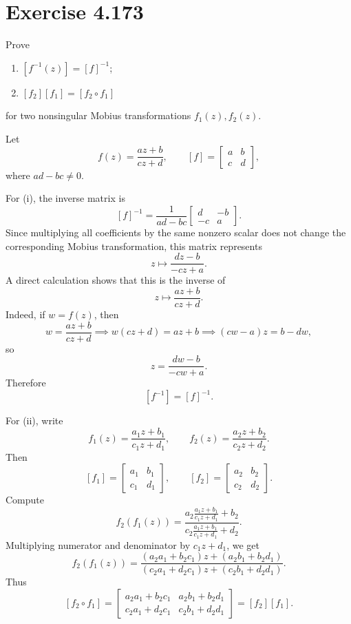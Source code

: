 \documentclass{article}
\begin{document}
\section{Exercise 4.173}

Prove

\begin{enumerate}
  \item[(i)] $[f^{-1}(z)]=[f]^{-1}$;
  \item[(ii)] $[f_2][f_1]=[f_2\circ f_1]$
\end{enumerate}
for two nonsingular Mobius transformations $f_1(z),f_2(z)$.

\begin{solution}
  Let
  \[
    f(z)=\frac{az+b}{cz+d},
    \qquad
    [f]=
    \begin{bmatrix}
      a & b \\
      c & d
    \end{bmatrix},
  \]
  where $ad-bc\ne0$.

  For (i), the inverse matrix is
  \[
    [f]^{-1}
    =
    \frac1{ad-bc}
    \begin{bmatrix}
      d & -b \\
      -c & a
    \end{bmatrix}.
  \]
  Since multiplying all coefficients by the same nonzero scalar does not
  change the corresponding Mobius transformation, this matrix represents
  \[
    z\mapsto
    \frac{dz-b}{-cz+a}.
  \]
  A direct calculation shows that this is the inverse of
  \[
    z\mapsto \frac{az+b}{cz+d}.
  \]
  Indeed, if $w=f(z)$, then
  \[
    w=\frac{az+b}{cz+d}
    \implies
    w(cz+d)=az+b
    \implies
    (cw-a)z=b-dw,
  \]
  so
  \[
    z=\frac{dw-b}{-cw+a}.
  \]
  Therefore
  \[
    [f^{-1}]=[f]^{-1}.
  \]

  For (ii), write
  \[
    f_1(z)=\frac{a_1z+b_1}{c_1z+d_1},
    \qquad
    f_2(z)=\frac{a_2z+b_2}{c_2z+d_2}.
  \]
  Then
  \[
    [f_1]=
    \begin{bmatrix}
      a_1 & b_1 \\
      c_1 & d_1
    \end{bmatrix},
    \qquad
    [f_2]=
    \begin{bmatrix}
      a_2 & b_2 \\
      c_2 & d_2
    \end{bmatrix}.
  \]
  Compute
  \[
    f_2(f_1(z))
    =
    \frac{
      a_2\frac{a_1z+b_1}{c_1z+d_1}+b_2
    }{
      c_2\frac{a_1z+b_1}{c_1z+d_1}+d_2
    }.
  \]
  Multiplying numerator and denominator by $c_1z+d_1$, we get
  \[
    f_2(f_1(z))
    =
    \frac{
      (a_2a_1+b_2c_1)z+(a_2b_1+b_2d_1)
    }{
      (c_2a_1+d_2c_1)z+(c_2b_1+d_2d_1)
    }.
  \]
  Thus
  \[
    [f_2\circ f_1]
    =
    \begin{bmatrix}
      a_2a_1+b_2c_1 & a_2b_1+b_2d_1 \\
      c_2a_1+d_2c_1 & c_2b_1+d_2d_1
    \end{bmatrix}
    =
    [f_2][f_1].
  \]
\end{solution}
\end{document}
